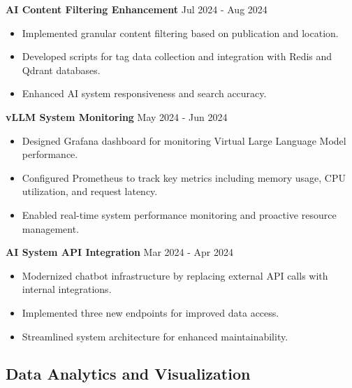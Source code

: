 \documentclass[a4paper,10pt]{article}
\begin{document}
\textbf{AI Content Filtering Enhancement} \hfill Jul 2024 - Aug 2024
\begin{itemize}[noitemsep, topsep=0pt]
    \item Implemented granular content filtering based on publication and location.
    \item Developed scripts for tag data collection and integration with Redis and Qdrant databases.
    \item Enhanced AI system responsiveness and search accuracy.
\end{itemize}
\textbf{vLLM System Monitoring} \hfill May 2024 - Jun 2024
\begin{itemize}[noitemsep, topsep=0pt]
    \item Designed Grafana dashboard for monitoring Virtual Large Language Model performance.
    \item Configured Prometheus to track key metrics including memory usage, CPU utilization, and request latency.
    \item Enabled real-time system performance monitoring and proactive resource management.
\end{itemize}
\textbf{AI System API Integration} \hfill Mar 2024 - Apr 2024
\begin{itemize}[noitemsep, topsep=0pt]
    \item Modernized chatbot infrastructure by replacing external API calls with internal integrations.
    \item Implemented three new endpoints for improved data access.
    \item Streamlined system architecture for enhanced maintainability.
\end{itemize}

\subsection*{Data Analytics and Visualization}
\end{document}
